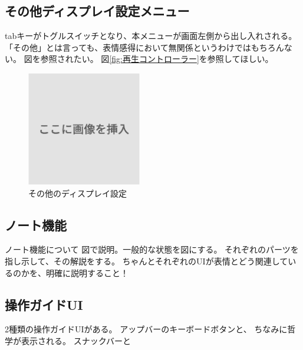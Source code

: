 \subsection{その他ディスプレイ設定メニュー}
tabキーがトグルスイッチとなり、本メニューが画面左側から出し入れされる。
「その他」とは言っても、表情感得において無関係というわけではもちろんない。
図を参照されたい。
図\ref{fig:再生コントローラー}を参照してほしい。
\begin{figure}[h]
  \centering
  \includegraphics[width=5cm]{images/dummy.png}
  \caption{その他のディスプレイ設定}
  \label{fig:その他のディスプレイ設定}
\end{figure}

\subsection{ノート機能}
ノート機能について
図で説明。一般的な状態を図にする。
それぞれのパーツを指し示して、その解説をする。
ちゃんとそれぞれのUIが表情とどう関連しているのかを、明確に説明すること！

\subsection{操作ガイドUI}
2種類の操作ガイドUIがある。
アップバーのキーボードボタンと、
ちなみに哲学が表示される。
スナックバーと






